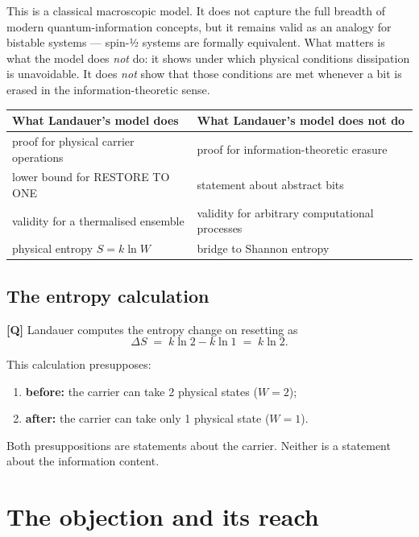 This is a classical macroscopic model. It does not capture the full breadth of
modern quantum-information concepts, but it remains valid as an analogy for
bistable systems --- spin-½ systems are formally equivalent. What matters is what
the model does \emph{not} do: it shows under which physical conditions dissipation
is unavoidable. It does \emph{not} show that those conditions are met whenever a
bit is erased in the information-theoretic sense.

\begin{center}
\small
\begin{tabular}{@{}p{}p{}@{}}
\toprule
\textbf{What Landauer's model does} & \textbf{What Landauer's model does not do} \\
\midrule
proof for physical carrier operations & proof for information-theoretic erasure \\
lower bound for \textup{RESTORE TO ONE} & statement about abstract bits \\
validity for a thermalised ensemble & validity for arbitrary computational processes \\
physical entropy $S = k\ln W$ & bridge to Shannon entropy \\
\bottomrule
\end{tabular}
\end{center}

\subsection{The entropy calculation}

\textbf{[Q]} Landauer computes the entropy change on resetting as
\begin{equation}
  \Delta S \;=\; k \ln 2 - k \ln 1 \;=\; k \ln 2 .
  \label{eq:landauer}
\end{equation}

This calculation presupposes:
\begin{enumerate}[leftmargin=1.6em,itemsep=0.2em]
  \item \textbf{before:} the carrier can take 2 physical states ($W=2$);
  \item \textbf{after:} the carrier can take only 1 physical state ($W=1$).
\end{enumerate}

Both presuppositions are statements about the carrier. Neither is a statement
about the information content.

\section{The objection and its reach}


